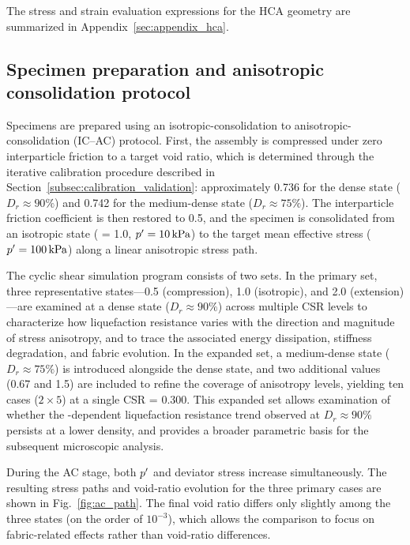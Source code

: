 The stress and strain evaluation expressions for the HCA geometry are summarized in Appendix~\ref{sec:appendix_hca}.

\subsection{Specimen preparation and anisotropic consolidation protocol}
\label{subsec:preparation}

Specimens are prepared using an isotropic-consolidation to anisotropic-consolidation (IC--AC) protocol. First, the assembly is compressed under zero interparticle friction to a target void ratio, which is determined through the iterative calibration procedure described in Section~\ref{subsec:calibration_validation}: approximately 0.736 for the dense state ($D_r \approx 90\%$) and 0.742 for the medium-dense state ($D_r \approx 75\%$). The interparticle friction coefficient is then restored to 0.5, and the specimen is consolidated from an isotropic state (\Kzero{} = 1.0, $p^\prime=\SI{10}{kPa}$) to the target mean effective stress ($p^\prime=\SI{100}{kPa}$) along a linear anisotropic stress path.

The cyclic shear simulation program consists of two sets. In the primary set, three representative \Kzero{} states---0.5 (compression), 1.0 (isotropic), and 2.0 (extension)---are examined at a dense state ($D_r \approx 90\%$) across multiple CSR levels to characterize how liquefaction resistance varies with the direction and magnitude of stress anisotropy, and to trace the associated energy dissipation, stiffness degradation, and fabric evolution. In the expanded set, a medium-dense state ($D_r \approx 75\%$) is introduced alongside the dense state, and two additional \Kzero{} values (0.67 and 1.5) are included to refine the coverage of anisotropy levels, yielding ten cases ($2 \times 5$) at a single CSR = 0.300. This expanded set allows examination of whether the \Kzero{}-dependent liquefaction resistance trend observed at $D_r \approx 90\%$ persists at a lower density, and provides a broader parametric basis for the subsequent microscopic analysis.

During the AC stage, both $p^\prime$ and deviator stress increase simultaneously. The resulting stress paths and void-ratio evolution for the three primary cases are shown in Fig.~\ref{fig:ac_path}. The final void ratio differs only slightly among the three states (on the order of $10^{-3}$), which allows the comparison to focus on fabric-related effects rather than void-ratio differences.

